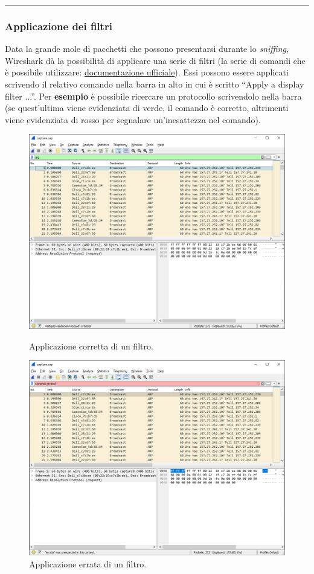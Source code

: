 \documentclass[a4paper]{article}
\newcommand{\longline}{\noindent\rule{\textwidth}{0.4pt}}
\newcommand{\dquotes}[1]{``#1''}
\begin{document}
	\longline
	
	\subsubsection{Applicazione dei filtri}\label{applicazione dei filtri}
	
	Data la grande mole di pacchetti che possono presentarsi durante lo \emph{sniffing}, Wireshark dà la possibilità di applicare una serie di filtri (la serie di comandi che è possibile utilizzare: \href{https://www.wireshark.org/docs/man-pages/wireshark-filter.html}{documentazione ufficiale}). Essi possono essere applicati scrivendo il relativo comando nella barra in alto in cui è scritto \dquotes{\textsf{Apply a display filter ...}}. Per \textcolor{Green4}{\textbf{esempio}} è possibile ricercare un protocollo scrivendolo nella barra (se quest'ultima viene evidenziata di verde, il comando è corretto, altrimenti viene evidenziata di rosso per segnalare un'inesattezza nel comando).
	\begin{figure}[!htp]
		\centering
		\includegraphics[width=\textwidth]{img/wireshark/grafica-wireshark-3.png}
		\caption{Applicazione corretta di un filtro.}
		\vspace{2em}
		\includegraphics[width=\textwidth]{img/wireshark/grafica-wireshark-4.png}
		\caption{Applicazione errata di un filtro.}
	\end{figure}\newpage
\end{document}
